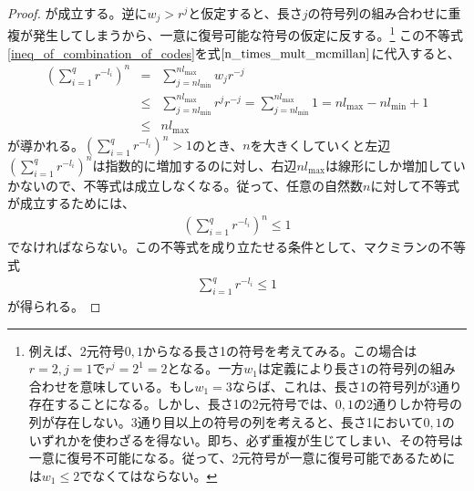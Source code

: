 \documentclass[uplatex,dvipdfmx,b5j,10pt]{jsbook}
\theoremstyle{definition}
\begin{document}
\begin{proof}
  が成立する。逆に$w_{j} > r^{j}$と仮定すると、長さ$j$の符号列の組み合わせに重複が発生してしまうから、一意に復号可能な符号の仮定に反する。\footnote{例えば、2元符号$0,1$からなる長さ1の符号を考えてみる。この場合は$r=2, j=1$で$r^{j}=2^{1}=2$となる。一方$w_{1}$は定義により長さ$1$の符号列の組み合わせを意味している。もし$w_{1} = 3$ならば、これは、長さ1の符号列が3通り存在することになる。しかし、長さ1の2元符号では、$0,1$の2通りしか符号の列が存在しない。3通り目以上の符号の列を考えると、長さ1において$0,1$のいずれかを使わざるを得ない。即ち、必ず重複が生じてしまい、その符号は一意に復号不可能になる。従って、2元符号が一意に復号可能であるためには$w_{1} \leq 2$でなくてはならない。}
  この不等式\ref{ineq_of_combination_of_codes}を式$\ref{n_times_mult_mcmillan}$に代入すると、
  \begin{eqnarray*}
    \left( \sum_{i=1}^{q} r^{-l_{i}} \right)^{n} &=& \sum_{j = nl_{\min}}^{nl_{\max}} w_{j} r^{-j} \\
    &\leq& \sum_{j = nl_{\min}}^{nl_{\max}} r^{j} r^{-j} = \sum_{j = nl_{\min}}^{nl_{\max}} 1 = nl_{\max} - nl_{\min} + 1 \\
    &\leq& nl_{\max}
  \end{eqnarray*}
  が導かれる。$(\sum_{i=1}^{q} r^{-l_{i}})^{n} > 1$のとき、$n$を大きくしていくと左辺$(\sum_{i=1}^{q} r^{-l_{i}})^{n}$は指数的に増加するのに対し、右辺$nl_{\max}$は線形にしか増加していかないので、不等式は成立しなくなる。従って、任意の自然数$n$に対して不等式が成立するためには、
  \begin{eqnarray*}
    \displaystyle\left( \sum_{i=1}^{q} r^{-l_{i}} \right)^{n} \leq 1
  \end{eqnarray*}
  でなければならない。この不等式を成り立たせる条件として、マクミランの不等式
  \begin{eqnarray*}
    \sum_{i=1}^{q} r^{-l_{i}} \leq 1
  \end{eqnarray*}
  が得られる。
\end{proof}
\end{document}
